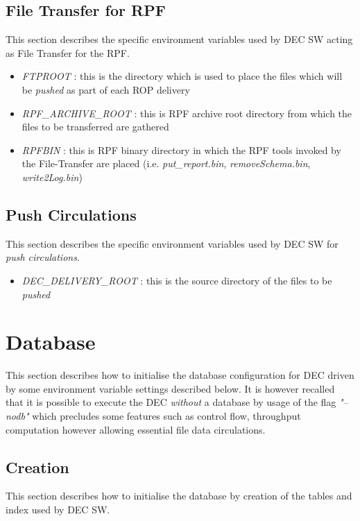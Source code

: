 \documentclass[dec_sum_main.tex]{subfiles}
\begin{document}
\subsection{File Transfer for RPF}
This section describes the specific environment variables used by DEC SW acting as File Transfer for the RPF.
\begin{itemize}
	\item \textit{FTPROOT} : this is the directory which is used to place the files which will be \textit{pushed} as part of each ROP delivery
	\item \textit{RPF\_ARCHIVE\_ROOT} : this is RPF archive root directory from which the files to be transferred are gathered
	\item \textit{RPFBIN} : this is RPF binary directory in which the RPF tools invoked by the File-Transfer are placed (i.e. \textit{put\_report.bin}, \textit{removeSchema.bin}, \textit{write2Log.bin})
\end{itemize}
\subsection{Push Circulations}
This section describes the specific environment variables used by DEC SW for \textit{push circulations}.
\begin{itemize}
	\item \textit{DEC\_DELIVERY\_ROOT} : this is the source directory of the files to be \textit{pushed} 
\end{itemize}

\section{Database}
This section describes how to initialise the database configuration for DEC driven by some environment variable settings described below. It is however recalled that it is possible to execute the DEC \textit{without} a database by usage of the flag \textit{"--nodb"} which precludes some features such as control flow, throughput computation however allowing essential file data circulations.


\subsection{Creation}

This section describes how to initialise the database by creation of the tables and index used by DEC SW.

\par
\end{document}
